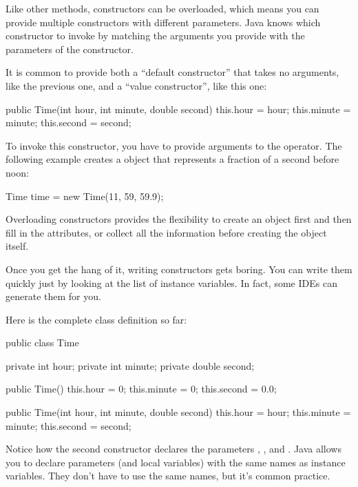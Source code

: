 
Like other methods, constructors can be overloaded, which means you can provide multiple constructors with different parameters.
Java knows which constructor to invoke by matching the arguments you provide with the parameters of the constructor.


It is common to provide both a ``default constructor'' that takes no arguments, like the previous one, and a ``value constructor'', like this one:

\begin{code}
public Time(int hour, int minute, double second) {
    this.hour = hour;
    this.minute = minute;
    this.second = second;
}
\end{code}

To invoke this constructor, you have to provide arguments to the  operator.
The following example creates a  object that represents a fraction of a second before noon:

\begin{code}
Time time = new Time(11, 59, 59.9);
\end{code}

Overloading constructors provides the flexibility to create an object first and then fill in the attributes, or collect all the information before creating the object itself.

Once you get the hang of it, writing constructors gets boring.
You can write them quickly just by looking at the list of instance variables.
In fact, some IDEs can generate them for you.

Here is the complete class definition so far:


\begin{code}
public class Time {
    private int hour;
    private int minute;
    private double second;

    public Time() {
        this.hour = 0;
        this.minute = 0;
        this.second = 0.0;
    }

    public Time(int hour, int minute, double second) {
        this.hour = hour;
        this.minute = minute;
        this.second = second;
    }
}
\end{code}

Notice how the second constructor declares the parameters , , and .
Java allows you to declare parameters (and local variables) with the same names as instance variables.
They don't have to use the same names, but it's common practice.

